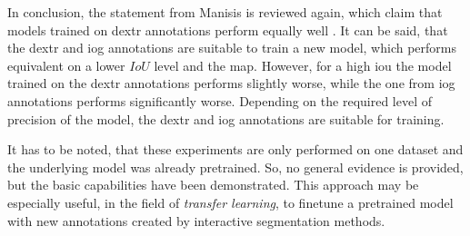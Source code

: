 In conclusion, the statement from Manisis \etal is reviewed again, which claim that models trained on \gls{dextr} annotations perform equally well \cite{Man18-DEXTR}.
It can be said, that the \gls{dextr} and \gls{iog} annotations are suitable to train a new model, which performs equivalent on a lower $ IoU$ level and the \gls{map}.
However, for a high \gls{iou} the model trained on the \gls{dextr} annotations performs slightly worse, while the one from \gls{iog} annotations performs significantly worse.
Depending on the required level of precision of the model, the \gls{dextr} and \gls{iog} annotations are suitable for training.

It has to be noted, that these experiments are only performed on one dataset and the underlying model was already pretrained.
So, no general evidence is provided, but the basic capabilities have been demonstrated.
This approach may be especially useful, in the field of \textit{transfer learning}, to finetune a pretrained model with new annotations created by interactive segmentation methods.

